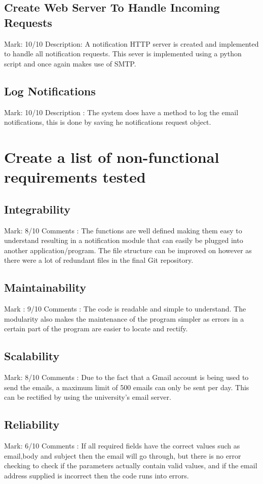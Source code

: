 \documentclass[11pt]{article}
\begin{document}
	\subsection{Create Web Server To Handle Incoming Requests} 
		Mark: 10/10
		Description: A notification HTTP server is created and implemented to handle all notification requests. This sever is implemented using a python script and once again makes use of SMTP.
		

	\subsection{Log Notifications} 
		Mark: 10/10
		Description : The system does have a method to log the email notifications, this is done by saving he notifications request object.
		


\section{Create a list of non-functional requirements tested}
	\subsection{Integrability}
		Mark: 8/10
		Comments : The functions are well defined making them easy to understand resulting in a notification module that can easily be plugged into another application/program. The file structure can be improved on however as there were a lot of redundant files in the final Git repository.
		

	\subsection{Maintainability}
		Mark : 9/10
		Comments : The code is readable and simple to understand. The modularity also makes the maintenance of the program simpler as errors in a certain part of the program are easier to locate and rectify. 
		

	\subsection{Scalability}
		Mark: 8/10
		Comments : Due to the fact that a Gmail account is being used to send the emails, a maximum limit of 500 emails can only be sent per day. This can be rectified by using the university's email server.
		

	\subsection{Reliability}
		Mark: 6/10
		Comments : If all required fields have the correct values such as email,body and subject then the email will go through, but there is no error checking to check if the parameters actually contain valid values, and if the email address supplied is incorrect then the code runs into errors.
		
\end{document}
